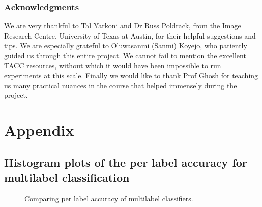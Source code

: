 \documentclass{article} %
\begin{document}
\subsubsection*{Acknowledgments}
We are very thankful to Tal Yarkoni and Dr Russ Poldrack, from the Image Research Centre, University of Texas at Austin, for their
helpful suggestions and tips. We are especially grateful to  Oluwasanmi (Sanmi) Koyejo, who patiently guided us through this entire project.
We cannot fail to mention the excellent TACC resources, without which it would have been impossible to run experiments at this scale.
Finally we would like to thank Prof Ghosh for teaching us many practical nuances in the course that helped immensely during the project.


\nocite{*}


\section{Appendix}

\subsection{Histogram plots of the per label accuracy for multilabel classification}
\begin{figure}[!hbt]
\vspace{-0.5cm}
\centering
{} 
\caption{Comparing per label accuracy of multilabel classifiers.}
\label{fig:perlab}
\end{figure}

\end{document}
